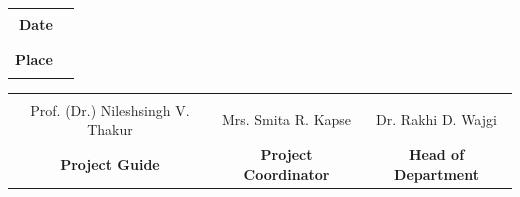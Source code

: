 \begin{certificate}
    \begin{table}[H]
        \begin{tabu} to \linewidth {r l}
            \textbf{Date} & \rule{80pt}{0.1pt}\\
            \textbf{Place} & \rule{80pt}{0.1pt}
        \end{tabu}
    \end{table}
    \begin{table}[b]
            \centering
            \setlength{\tabcolsep}{6 pt}
            \begin{tabu} to \linewidth {C C C}
                {\hrulefill} & {\hrulefill} & {\hrulefill}\\
                {Prof. (Dr.) Nileshsingh V. Thakur} & {Mrs. Smita R. Kapse} & {Dr. Rakhi D. Wajgi}\\
                \textbf{Project Guide} & \textbf{Project Coordinator} & \textbf{Head of Department}
            \end{tabu}
        \end{table}
\end{certificate}